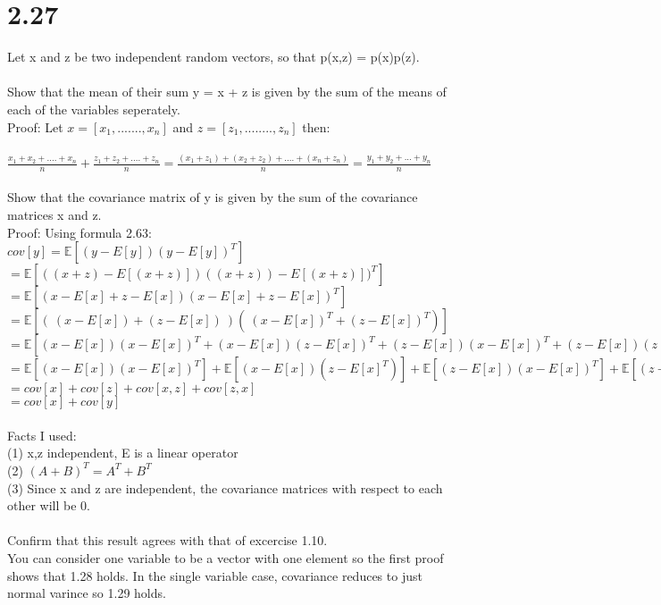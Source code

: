 \documentclass[11pt,leqno,fleqn]{article}
\begin{document}
\section{2.27}
Let x and z be two independent random vectors, so that p(x,z) = p(x)p(z).\\
\\
Show that the mean of their sum y = x + z is given by the sum of the means of each of the variables seperately.\\
Proof: Let $x = [x_1,.......,x_n]$ and $z = [z_1,........,z_n]$ then: \\
\\
$\frac{x_1 + x_2+ .... + x_n}{n} + \frac{z_1 + z_2 + .... + z_n}{n} = \frac{(x_1+z_1) + (x_2 + z_2) + .... + (x_n + z_n)}{n} = \frac{y_1 + y_2 + ... + y_n}{n}$\\
\\ 
Show that the covariance matrix of y is given by the sum of the covariance matrices x and z.\\
Proof: Using formula 2.63:\\
$cov[y] = \mathbb{E}[(y - E[y])(y - E[y])^{T}]$\\
$=  \mathbb{E}[((x+z) - E[(x+ z)])((x+z)) - E[(x+z)])^{T}]$\\
$=\mathbb{E}[(x - E[x] + z - E[x])(x - E[x] + z - E[x])^{T}] $  
$=\mathbb{E}[( \ (x - E[x]) + (z - E[x]) \ )( \ (x - E[x])^{T} + (z - E[x])^{T})] $
$= \mathbb{E}[  (x - E[x])(x - E[x])^{T} + (x - E[x])(z - E[x])^{T} +  (z - E[x])(x - E[x])^{T}  +  (z - E[x]) (z - E[x])^{T}] $\\
$= \mathbb{E}[ (x - E[x])(x - E[x])^{T}] + \mathbb{E}[ (x - E[x])(z - E[x]^{T})] + \mathbb{E}[(z - E[x])(x - E[x])^{T}] + \mathbb{E}[(z - E[x]) (z - E[x])^{T})] $ \\
$= cov[x] + cov[z] + cov[x,z] + cov[z,x]$\\
$= cov[x] + cov[y]$ 
\\
\\
Facts I used:\\
 (1) x,z independent, E is a linear operator\\
 (2)  $(A + B)^{T} = A^{T} + B^{T}$\\
 (3) Since x and z are independent, the covariance matrices with respect to each other will be 0.\\
 \\
Confirm that this result agrees with that of excercise 1.10.\\
You can consider one variable to be a vector with one element so the first proof shows that 1.28 holds.
In the single variable case, covariance reduces to just normal varince so 1.29 holds.
\end{document}
